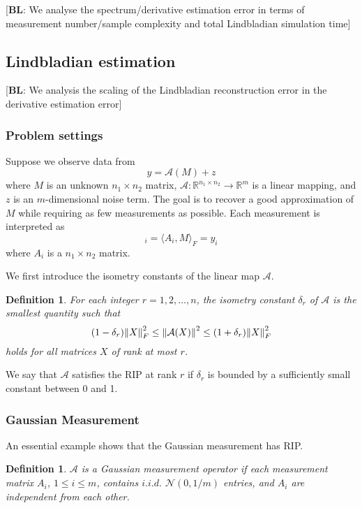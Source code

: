 \documentclass[10pt]{article}  %
\theoremstyle{plain}
\newtheorem{definition}[thm]{Definition}
\numberwithin{equation}{section}
\newcommand{\innerp}[1]{\langle{#1}\rangle}
\def\mN{\mathcal{N}}
\def\mA{\mathcal{A}}
\def\R{\mathbb{R}}
\newcommand{\bl}[1]{{\color{magenta} [\textbf{BL}: #1]}}
\begin{document}
\bl{We analyse the spectrum/derivative estimation error in terms of measurement number/sample complexity and total Lindbladian simulation time}

\subsection{Lindbladian estimation}

\bl{We analysis the scaling of the Lindbladian reconstruction error in the derivative estimation error}

\subsubsection{Problem settings}
Suppose we observe data from 
\begin{equation}
	y = \mA(M) + z
\end{equation}
where $M$ is an unknown $n_1 \times n_2$ matrix, $\mA : \R^{n_1\times n_2} \to \R^m$ is a linear mapping, and $z$ is an $m$-dimensional noise term. The goal is to recover a good approximation of $M$ while requiring as few measurements as possible. Each measurement is interpreted as 
\begin{equation}
	[\mA(M)]_i = \innerp{A_i, M}_F = y_i
\end{equation}
where $A_i$ is a $n_1\times n_2$ matrix.





We first introduce the isometry constants of the linear map $\mA$. 
\begin{definition}
	For each integer $r = 1, 2, \dots , n$, the isometry constant $\delta_r$ of $\mA$ is the smallest quantity such that 
	\begin{equation}
		(1 - \delta_r)\norm{X}_F^2 \leq \norm{\mA(X)}^2 \leq (1 + \delta_r) \norm{X}_F^2
	\end{equation}
	holds for all matrices $X$ of rank at most $r$. 
\end{definition}
We say that $\mA$ satisfies the RIP at rank $r$ if $\delta_r$ is bounded by a sufficiently small constant between 0 and 1. 



\subsubsection{Gaussian Measurement}
An essential example shows that the Gaussian measurement has RIP.
\begin{definition}
	$\mA$ is a Gaussian measurement operator if each measurement matrix $A_i$, $1 \leq i \leq m$, contains $i.i.d.$ $\mN(0, 1/m)$ entries, and $A_i$ are independent from each other. 
\end{definition}
\end{document}
